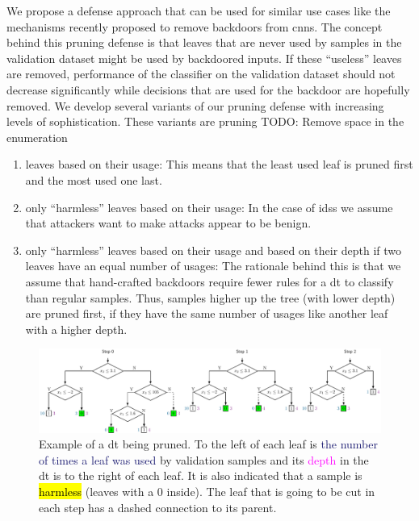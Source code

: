 \documentclass[10pt,sigconf,letterpaper,dvipsnames]{acmart}
\newcommand\note[2]{{\color{#1}#2}}
\newcommand\todo[1]{{\note{red}{TODO: #1}}}
\begin{document}
We propose a defense approach that can be used for similar use cases like the mechanisms recently proposed to remove backdoors from \glspl{cnn}. The concept behind this pruning defense is that leaves that are never used by samples in the validation dataset might be used by backdoored inputs. If these ``useless'' leaves are removed, performance of the classifier on the validation dataset should not decrease
significantly
while decisions that are used for the backdoor are hopefully removed. We develop several variants of our pruning defense with increasing levels of sophistication. These variants are pruning \todo{Remove space in the enumeration}
\begin{enumerate}[wide, labelwidth=!, labelindent=0pt]
\item leaves based on their usage: This means that the least used leaf is pruned first and the most used one last.
\item only ``harmless'' leaves based on their usage: In the case of \glspl{ids} we assume that attackers want to make attacks appear to be benign.
\item only ``harmless'' leaves based on their usage and based on their depth if two leaves have an equal number of usages: The rationale behind this is that we assume that hand-crafted backdoors require fewer rules for a \gls{dt} to classify than regular samples. Thus, samples higher up the tree (with lower depth) are pruned first, if they have the same number of usages like another leaf with a higher depth.
\end{enumerate}
\begin{figure}[h]
\includegraphics[width=\textwidth]{pruning_example.pdf}
\caption{Example of a \gls{dt} being pruned. To the left of each leaf is \textcolor{MidnightBlue}{the number of times a leaf was used} by validation samples and its \textcolor{Fuchsia}{depth} in the \gls{dt} is to the right of each leaf. It is also indicated that a sample is \protect{} \hl{harmless} (leaves with a 0 inside). The leaf that is going to be cut in each step has a dashed connection to its parent.}
\label{fig:pruningExample}
\end{figure}
\end{document}

